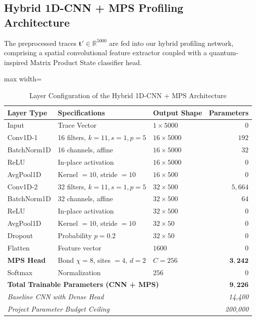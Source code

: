 \documentclass[letterpaper]{article}
\begin{document}
\subsection{Hybrid 1D-CNN + MPS Profiling Architecture}
The preprocessed traces $\mathbf{t}' \in \mathbb{R}^{5000}$ are fed into our hybrid profiling network, comprising a spatial convolutional feature extractor coupled with a quantum-inspired Matrix Product State classifier head.

\begin{table}[htbp]
\centering
\caption{Layer Configuration of the Hybrid 1D-CNN + MPS Architecture}
\label{tab:network_layers}
\begin{adjustbox}{max width=\linewidth}
\small
\begin{tabular}{|l|l|l|r|}
\hline
\textbf{Layer Type} & \textbf{Specifications} & \textbf{Output Shape} & \textbf{Parameters} \\ 
\hline
Input & Trace Vector & $1 \times 5000$ & $0$ \\
\hline
Conv1D-1 & 16 filters, $k=11, s=1, p=5$ & $16 \times 5000$ & $192$ \\
BatchNorm1D & 16 channels, affine & $16 \times 5000$ & $32$ \\
ReLU & In-place activation & $16 \times 5000$ & $0$ \\
AvgPool1D & Kernel $=10$, stride $=10$ & $16 \times 500$ & $0$ \\
\hline
Conv1D-2 & 32 filters, $k=11, s=1, p=5$ & $32 \times 500$ & $5,664$ \\
BatchNorm1D & 32 channels, affine & $32 \times 500$ & $64$ \\
ReLU & In-place activation & $32 \times 500$ & $0$ \\
AvgPool1D & Kernel $=10$, stride $=10$ & $32 \times 50$ & $0$ \\
Dropout & Probability $p = 0.2$ & $32 \times 50$ & $0$ \\
\hline
Flatten & Feature vector & $1600$ & $0$ \\
\hline
\textbf{MPS Head} & Bond $\chi=8$, sites $=4$, $d=2$ & $C = 256$ & $\mathbf{3,242}$ \\
\hline
Softmax & Normalization & $256$ & $0$ \\
\hline
\multicolumn{3}{|l|}{\textbf{Total Trainable Parameters (CNN + MPS)}} & $\mathbf{9,226}$ \\
\multicolumn{3}{|l|}{\textit{Baseline CNN with Dense Head}} & \textit{14,400} \\
\multicolumn{3}{|l|}{\textit{Project Parameter Budget Ceiling}} & \textit{200,000} \\
\hline
\end{tabular}
\end{adjustbox}
\end{table}
\end{document}
